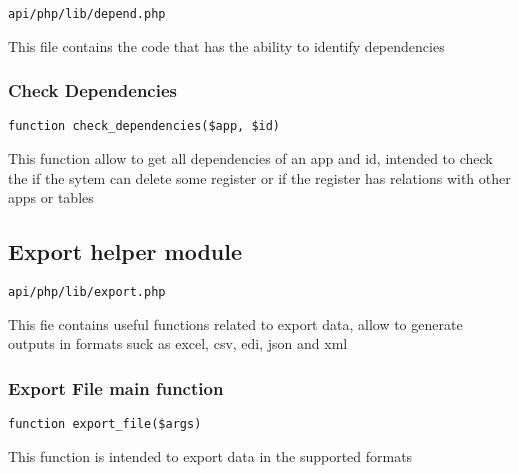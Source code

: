 \documentclass[a4paper]{article}
\begin{document}
\begin{lstlisting}
api/php/lib/depend.php
\end{lstlisting}

This file contains the code that has the ability to identify dependencies

\hypertarget{toc436}{}
\subsubsection{Check Dependencies}

\begin{lstlisting}
function check_dependencies($app, $id)
\end{lstlisting}

This function allow to get all dependencies of an app and id, intended to check
the if the sytem can delete some register or if the register has relations with
other apps or tables

\hypertarget{toc437}{}
\subsection{Export helper module}

\begin{lstlisting}
api/php/lib/export.php
\end{lstlisting}

This fie contains useful functions related to export data, allow to generate outputs in formats
suck as excel, csv, edi, json and xml

\hypertarget{toc438}{}
\subsubsection{Export File main function}

\begin{lstlisting}
function export_file($args)
\end{lstlisting}

This function is intended to export data in the supported formats
\end{document}
